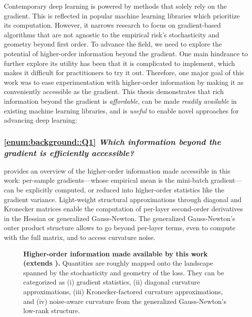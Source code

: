 Contemporary deep learning is powered by methods that solely rely on the
gradient. This is reflected in popular machine learning libraries which
prioritize its computation. However, it narrows research to focus on
gradient-based algorithms that are not agnostic to the empirical risk's
stochasticity and geometry beyond first order. To advance the field, we need to
explore the potential of higher-order information beyond the gradient. One main
hindrance to further explore its utility has been that it is complicated to
implement, which makes it difficult for practitioners to try it out. Therefore,
one major goal of this work was to ease experimentation with higher-order
information by making it as conveniently accessible as the gradient. This thesis
demonstrates that rich information beyond the gradient is \emph{affordable}, can
be made \emph{readily available} in existing machine learning libraries, and is
\emph{useful} to enable novel approaches for advancing deep learning:

\subsubsection{\ref{enum:background::Q1} \emph{Which information beyond the
    gradient is efficiently accessible?}}

 provides an overview of the
higher-order information made accessible in this work: per-sample
gradients---whose empirical mean is the mini-batch gradient---can be explicitly
computed, or reduced into higher-order statistics like the gradient variance.
Light-weight structural approximations through diagonal and Kronecker matrices
enable the computation of per-layer second-order derivatives in the Hessian or
generalized Gauss-Newton. The generalized Gauss-Newton's outer product structure
allows to go beyond per-layer terms, even to compute with the full matrix, and
to access curvature noise.

\begin{figure}[!b]
  \centering
  \tikzexternalenable%
  \tikzexternaldisable%
  
  \tikzexternaldisable%
  \caption{\textbf{Higher-order information made available by this work (extends
      ).} Quantities are roughly
    mapped onto the landscape spanned by the stochasticity and geometry of the
    loss. They can be categorized as (i) gradient statistics, (ii) diagonal
    curvature approximations, (iii) Kronecker-factored curvature approximations,
    and (iv) noise-aware curvature from the generalized Gauss-Newton's low-rank
    structure.}\label{fig:conclusion::higher_order_information}
\end{figure}

